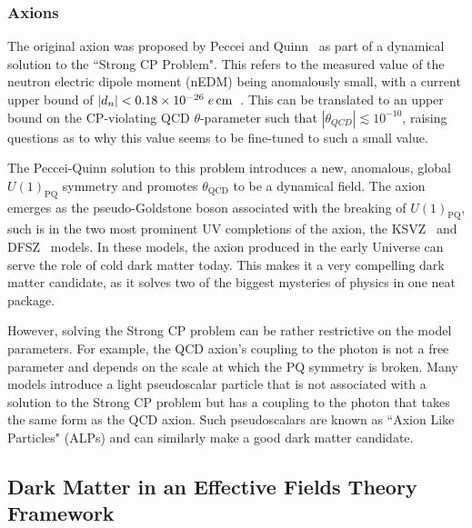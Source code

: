 \subsubsection{Axions}

The original axion was proposed by Peccei and Quinn~\cite{Peccei:1977hh_CPConservationPresence} as part of a dynamical solution to the ``Strong CP Problem". This refers to the measured value of the neutron electric dipole moment (nEDM) being anomalously small, with a current upper bound of $|d_n| < 0.18\times 10^{-26}\;e{\rm \,cm}$~\cite{Abel:2020pzs_feb_MeasurementPermanentElectric}. This can be translated to an upper bound on the CP-violating QCD $\theta$-parameter such that $|\theta_{QCD}|\lesssim 10^{-10}$, raising questions as to why this value seems to be fine-tuned to such a small value. 

The Peccei-Quinn solution to this problem introduces a new, anomalous, global  $U(1)_{\mathrm{PQ}}$ symmetry and promotes $\theta_\mathrm{QCD}$ to be a dynamical field.
The axion emerges as the pseudo-Goldstone boson associated with the breaking of $U(1)_\mathrm{PQ}$, such is in the two most prominent UV completions of the axion, the KSVZ~\cite{Kim:1979if_WeakInteractionSinglet, Shifman:1979if_CanConfinementEnsure} and DFSZ~\cite{_PossibleSuppressionAxion, Dine:1981rt_SimpleSolutionStrong} models. In these models, the axion produced in the early Universe can serve the role of cold dark matter today. This makes it a very compelling dark matter candidate, as it solves two of the biggest mysteries of physics in one neat package. 

However, solving the Strong CP problem can be rather restrictive on the model parameters. For example, the QCD axion's coupling to the photon is not a free parameter and depends on the scale at which the PQ symmetry is broken. Many models introduce a light pseudoscalar particle that is not associated with a solution to the Strong CP problem but has a coupling to the photon that takes the same form as the QCD axion. Such pseudoscalars are known as ``Axion Like Particles" (ALPs) and can similarly make a good dark matter candidate.


\subsection{Dark Matter in an Effective Fields Theory Framework}
\label{subsec:DM_EFTs}

